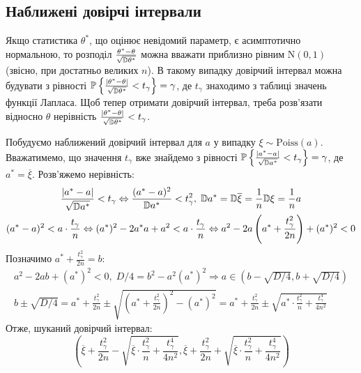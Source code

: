 \subsection{Наближені довірчі інтервали}
Якщо статистика $\theta^*$, що оцінює невідомий параметр, є асимптотично нормальною, то розподіл 
$\frac{\theta^* - \theta}{\sqrt{\mathbb{D}\theta^*}}$ можна вважати приблизно рівним $\mathrm{N}(0, 1)$ (звісно, при достатньо великих $n$).
В такому випадку довірчий інтервал можна будувати з рівності
$\mathbb{P}\left\{\frac{|\theta^* - \theta|}{\sqrt{\mathbb{D}\theta^*}} < t_{\gamma}\right\} = \gamma$, де $t_{\gamma}$
знаходимо з таблиці значень функції Лапласа. Щоб тепер отримати довірчий інтервал, треба розв'язати відносно
$\theta$ нерівність $\frac{|\theta^* - \theta|}{\sqrt{\mathbb{D}\theta^*}} < t_{\gamma}$.
\begin{example}
    Побудуємо наближений довірчий інтервал для $a$ у випадку $\xi \sim \mathrm{Poiss}(a)$. Вважатимемо, що значення $t_\gamma$
    вже знайдемо з рівності 
    $\mathbb{P}\left\{\frac{|a^* - a|}{\sqrt{\mathbb{D} a^*}} < t_{\gamma}\right\} = \gamma$, де $a^* = \overline{\xi}$. Розв'яжемо нерівність:
    \begin{gather*}
        \frac{|a^* - a|}{\sqrt{\mathbb{D} a^*}} < t_{\gamma} \Leftrightarrow
        \frac{(a^* - a)^2}{\mathbb{D} a^*} < t_{\gamma}^2, \; \mathbb{D} a^* = \mathbb{D} \overline{\xi} = \frac{1}{n}\mathbb{D}\xi = \frac{1}{n}{a} \\
        (a^* - a)^2 < a \cdot \frac{t_{\gamma}}{n} \Leftrightarrow (a^*)^2 - 2a^* a + a^2 < a \cdot \frac{t_{\gamma}}{n}
        \Leftrightarrow a^2 - 2a \left( a^* + \frac{t_{\gamma}^2}{2n}\right) + (a^*)^2 < 0
    \end{gather*}
    Позначимо $a^* + \frac{t_{\gamma}^2}{2n} = b$:
    \begin{gather*}
        a^2 - 2ab + (a^*)^2 < 0, \; D/4 = b^2 - a^2 (a^*)^2 \Rightarrow
        a \in \left(b - \sqrt{D/4}, b + \sqrt{D/4} \right) \\
        b \pm \sqrt{D/4} =  a^* + \frac{t_{\gamma}^2}{2n} \pm 
        \sqrt{\left( a^* + \frac{t_{\gamma}^2}{2n}\right)^2  - (a^*)^2} = 
        a^* + \frac{t_{\gamma}^2}{2n} \pm 
        \sqrt{a^* \cdot\frac{t_{\gamma}^2}{n} + \frac{t_{\gamma}^4}{4n^2}}
    \end{gather*}
    Отже, шуканий довірчий інтервал:
    $$ 
    \left(\overline{\xi} + \frac{t_{\gamma}^2}{2n} -
    \sqrt{\overline{\xi} \cdot\frac{t_{\gamma}^2}{n} + \frac{t_{\gamma}^4}{4n^2}},
    \overline{\xi} + \frac{t_{\gamma}^2}{2n} +
    \sqrt{\overline{\xi} \cdot\frac{t_{\gamma}^2}{n} + \frac{t_{\gamma}^4}{4n^2}}
    \right)
    $$
\end{example}

